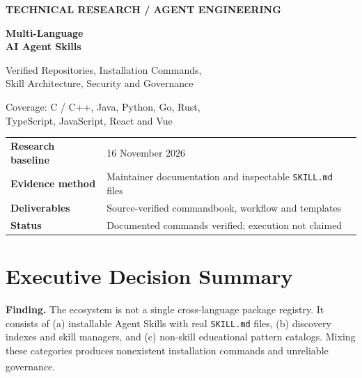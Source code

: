 \documentclass[11pt,letterpaper]{article}
\newcommand{\src}[1]{\textsuperscript{\textcolor{teal}{\cite{#1}}}}
\begin{document}
\hypersetup{pageanchor=false}%
\begin{titlepage}
\pagecolor{navy}\color{white}
\vspace*{1.05in}
{\small\bfseries\color{white}TECHNICAL RESEARCH \quad / \quad AGENT ENGINEERING}\par
\vspace{0.4in}
{\fontsize{31}{38}\selectfont\bfseries Multi-Language\\[0.1em]AI Agent Skills}\par
\vspace{0.23in}
{\Large\color{white}Verified Repositories, Installation Commands,\\Skill Architecture, Security and Governance}\par
\vspace{0.55in}
\par
\vspace{0.45in}
{\large\color{white}Coverage: C / C++, Java, Python, Go, Rust,\\TypeScript, JavaScript, React and Vue}\par
\vfill
\begin{tabular}{@{}ll@{}}
\textbf{Research baseline} & 16 November 2026\\
\textbf{Evidence method} & Maintainer documentation and inspectable \texttt{SKILL.md} files\\
\textbf{Deliverables} & Source-verified commandbook, workflow and templates\\
\textbf{Status} & Documented commands verified; execution not claimed\\
\end{tabular}
\vspace*{0.65in}
\end{titlepage}\hypersetup{pageanchor=true}
\nopagecolor\color{ink}
\tableofcontents
\newpage

\section{Executive Decision Summary}
\begin{insight}
\textbf{Finding.} The ecosystem is not a single cross-language package registry. It consists of (a) installable Agent Skills with real \texttt{SKILL.md} files, (b) discovery indexes and skill managers, and (c) non-skill educational pattern catalogs. Mixing these categories produces nonexistent installation commands and unreliable governance.\src{spec,vercelcli,patternsrepo,lazyskills}
\end{insight}
\end{document}
